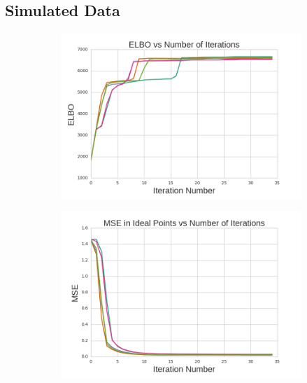 \documentclass{article}
\begin{document}
\subsection{Simulated Data}
\begin{figure}[h]
  \centering
    \begin{subfigure}[b]{0.3\textwidth}
        \includegraphics[width=\textwidth]{toy_elbos.png}
        \caption{}
    \end{subfigure}
          \begin{subfigure}[b]{0.3\textwidth}
        \includegraphics[width=\textwidth]{toy_ip_mse.png}
        \caption{}
    \end{subfigure}
        \begin{subfigure}[b]{0.3\textwidth}

\end{subfigure}
\end{figure}
\end{document}

